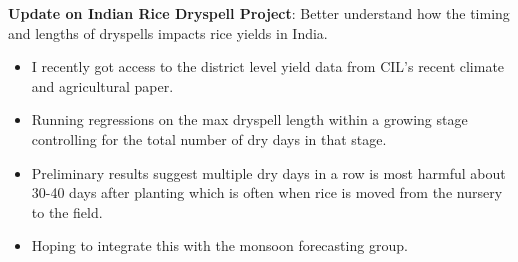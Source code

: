 \documentclass[10.95pt, letterpaper]{article}
\begin{document}
\textbf{Update on Indian Rice Dryspell Project}: Better understand how the timing and lengths of dryspells impacts rice yields in India. 
\begin{itemize}
    \item I recently got access to the district level yield data from CIL's recent climate and agricultural paper.
    \item Running regressions on the max dryspell length within a growing stage controlling for the total number of dry days in that stage. 
    \item Preliminary results suggest multiple dry days in a row is most harmful about 30-40 days after planting which is often when rice is moved from the nursery to the field. 
    \item Hoping to integrate this with the monsoon forecasting group.
\end{itemize}
\end{document}
